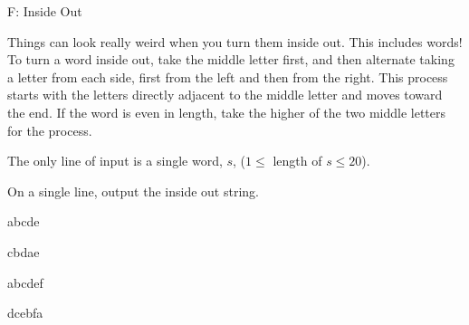 \begin{problem}{F: Inside Out}

Things can look really weird when you turn them inside out.
This includes words!
To turn a word inside out, take the middle letter first, and then alternate taking a letter from each side, first from the left and then from the right.
This process starts with the letters directly adjacent to the middle letter and moves toward the end.
If the word is even in length, take the higher of the two middle letters for the process.
\end{problem}

\begin{formalin}
The only line of input is a single word, $s$, ($1 \leq$ length of $s \leq 20$).
\end{formalin}

\begin{formalout}
On a single line, output the inside out string.
\end{formalout}

\begin{datain}
abcde
\end{datain}
\begin{dataout}
cbdae
\end{dataout}

\begin{datain}
abcdef
\end{datain}
\begin{dataout}
dcebfa
\end{dataout}

